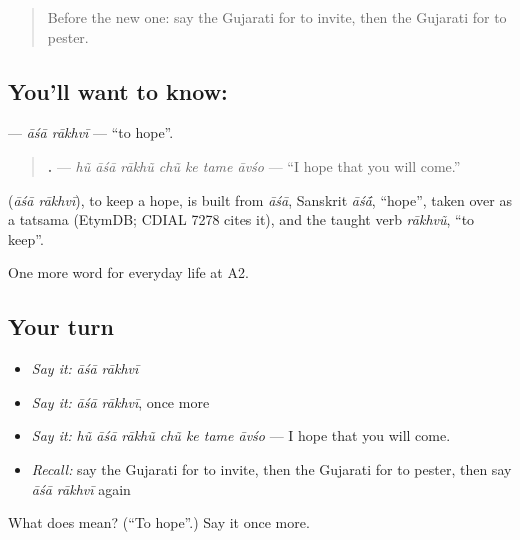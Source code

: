 \label{lesson:GU-C272-asha-rakhvi}



\begin{quote}
Before the new one: say the Gujarati for to invite, then the Gujarati for to pester.
\end{quote}

\subsection*{You'll want to know:  }
\textbf{ } — \emph{āśā rākhvī} — \textquotedblleft{}to hope\textquotedblright{}.

\begin{quote}
\textbf{      .} — \emph{hũ āśā rākhũ chũ ke tame āvśo} — \textquotedblleft{}I hope that you will come.\textquotedblright{}
\end{quote}

\begin{cousinweb}
\textbf{ } (\emph{āśā rākhvī}), to keep a hope, is built from \emph{āśā}, Sanskrit \emph{āś\'{\={a}}}, \textquotedblleft{}hope\textquotedblright{}, taken over as a tatsama (EtymDB; CDIAL 7278 cites it), and the taught verb \emph{rākhvũ}, \textquotedblleft{}to keep\textquotedblright{}.
\end{cousinweb}

\begin{grammarlens}[title={What you've built}]
One more word for everyday life at A2.
\end{grammarlens}

\subsection*{Your turn}
\begin{itemize}
\raggedright
  \item \emph{Say it:} \emph{āśā rākhvī}
  \item \emph{Say it:} \emph{āśā rākhvī}, once more
  \item \emph{Say it:} \emph{hũ āśā rākhũ chũ ke tame āvśo} — I hope that you will come.
  \item \emph{Recall:} say the Gujarati for to invite, then the Gujarati for to pester, then say \emph{āśā rākhvī} again
\end{itemize}

\begin{tcolorbox}[breakable,colback=teal!4,colframe=teal!35!black,title={Before you move on}]
What does   mean? (\textquotedblleft{}To hope\textquotedblright{}.) Say it once more.
\end{tcolorbox}
